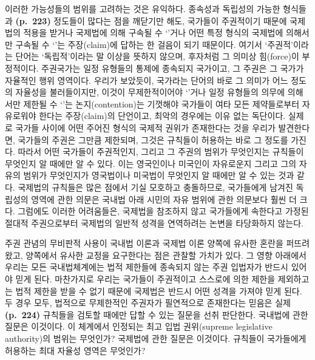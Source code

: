 이러한 가능성들의 범위를 고려하는 것은 유익하다. 종속성과 독립성의
가능한 형식들과 \textbf{(p.~223)} 정도들이 많다는 점을 깨닫기만 해도,
국가들이 주권적이기 때문에 국제법의 적용을 받거나 국제법에 의해 구속될
수 ‘’거나 어떤 특정 형식의 국제법에 의해서만 구속될 수
‘’는 주장(claim)에 답하는 한 걸음이 되기 때문이다. 여기서
‘주권적’이라는 단어는 ‘독립적’이라는 말 이상을 뜻하지 않으며, 후자처럼
그 의미상 힘(force)이 부정적이다. 주권국가는 일정 유형들의 통제에
종속되지  국가이고, 그 주권은 그 국가가 자율적인 행위
영역이다. 우리가 보았듯이, 국가라는 단어의 바로 그 의미가 어느 정도의
자율성을 불러들이지만, 이것이 무제한적이어야 ‘’거나 일정
유형들의 의무에 의해서만 제한될 수 ‘’는 논지(contention)는
기껏해야 국가들이 여타 모든 제약들로부터 자유로워야 한다는 주장(claim)의
단언이고, 최악의 경우에는 이유 없는 독단이다. 실제로 국가들 사이에 어떤
주어진 형식의 국제적 권위가 존재한다는 것을 우리가 발견한다면, 국가들의
주권은 그만큼 제한되며, 그것은 규칙들이 허용하는 바로 그 정도를 가진다.
따라서 어떤 국가들이 주권적인지, 그리고 그 주권의 범위가 무엇인지는
규칙들이 무엇인지 알 때에만 알 수 있다. 이는 영국인이나 미국인이
자유로운지 그리고 그의 자유의 범위가 무엇인지가 영국법이나 미국법이
무엇인지 알 때에만 알 수 있는 것과 같다. 국제법의 규칙들은 많은 점에서
기실 모호하고 충돌하므로, 국가들에게 남겨진 독립성의 영역에 관한 의문은
국내법 아래 시민의 자유 범위에 관한 의문보다 훨씬 더 크다. 그럼에도
이러한 어려움들은, 국제법을 참조하지 않고 국가들에게 속한다고 가정된
절대적 주권으로부터 국제법의 일반적 성격을 연역하려는  논변을 타당화하지 않는다.

주권 관념의 무비판적 사용이 국내법 이론과 국제법 이론 양쪽에 유사한
혼란을 퍼뜨려 왔고, 양쪽에서 유사한 교정을 요구한다는 점은 관찰할 가치가
있다. 그 영향 아래에서 우리는 모든 국내법체계에는 법적 제한들에 종속되지
않는 주권 입법자가 반드시 있어야  믿게 된다. 마찬가지로
우리는 국가들이 주권적이고 스스로에 의한 제한을 제외하고는 법적 제한을
받을 수 없기 때문에 국제법은 반드시 어떤 성격을 가져야 
믿게 된다. 두 경우 모두, 법적으로 무제한적인 주권자가 필연적으로
존재한다는 믿음은 실제 \textbf{(p.~224)} 규칙들을 검토할 때에만 답할 수
있는 질문을 선취 판단한다. 국내법에 관한 질문은 이것이다. 이 체계에서
인정되는 최고 입법 권위(supreme legislative authority)의 범위는
무엇인가? 국제법에 관한 질문은 이것이다. 규칙들이 국가들에게 허용하는
최대 자율성 영역은 무엇인가?

